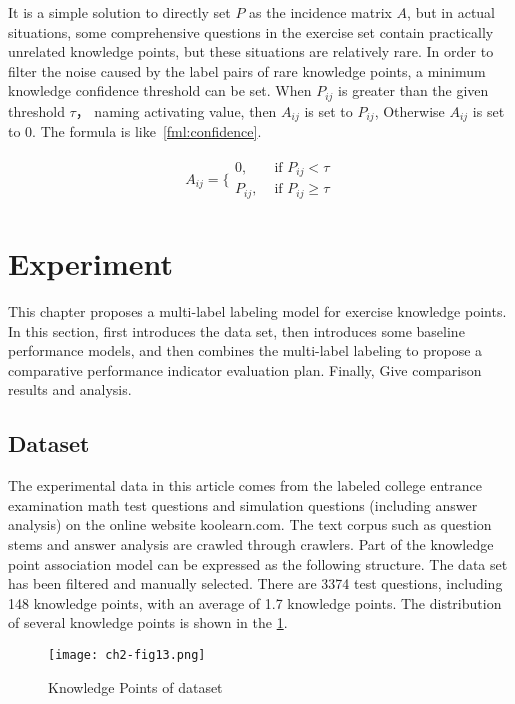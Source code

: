 It is a simple solution to directly set \(P\) as the incidence matrix \(A\), but in actual situations, some comprehensive questions in the exercise set contain practically unrelated knowledge points, but these situations are relatively rare. In order to filter the noise caused by the label pairs of rare knowledge points, a minimum knowledge confidence threshold can be set. When \(P_{ij}\) is greater than the given threshold \(\tau \)， naming activating value, then \(A_{ij}\) is set to \(P_{ij}\), Otherwise \(A_{ij}\) is set to 0. The formula is like~\ref{fml:confidence}.

\begin{align}
	A_{ij}=\{\begin{array}{ll}
		0,      & \text{ if } P_{ij}<\tau      \\
		P_{ij}, & \text{ if } P_{ij} \geq \tau
	\end{array}\label{fml:confidence}
\end{align}

\section{Experiment}
This chapter proposes a multi-label labeling model for exercise knowledge points. In this section, first introduces the data set, then introduces some baseline performance models, and then combines the multi-label labeling to propose a comparative performance indicator evaluation plan. Finally, Give comparison results and analysis.
\subsection{Dataset}
The experimental data in this article comes from the labeled college entrance examination math test questions and simulation questions (including answer analysis) on the online website koolearn.com. The text corpus such as question stems and answer analysis are crawled through crawlers. Part of the knowledge point association model can be expressed as the following structure. The data set has been filtered and manually selected. There are 3374 test questions, including 148 knowledge points, with an average of 1.7 knowledge points. The distribution of several knowledge points is shown in the \figurename{\ref{ch2-fig13}}.
\begin{figure}[htbp!]
	\centering
	\texttt{[image: ch2-fig13.png]}
	\caption{Knowledge Points of dataset}\label{ch2-fig13}
\end{figure}

